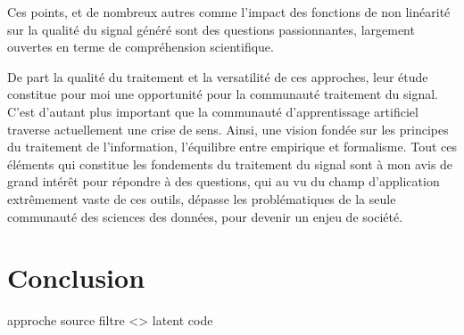 Ces points, et de nombreux autres comme l'impact des fonctions de non linéarité sur la qualité du signal généré sont des questions passionnantes, largement ouvertes en terme de compréhension scientifique.

De part la qualité du traitement et la versatilité de ces approches, leur étude constitue pour moi une opportunité pour la communauté traitement du signal. C'est d'autant plus important que la communauté d'apprentissage artificiel traverse actuellement une crise de sens. Ainsi, une vision fondée sur les principes du traitement de l'information, l'équilibre entre empirique et formalisme. Tout ces éléments qui constitue les fondements du traitement du signal sont à mon avis de grand intérêt pour répondre à des questions, qui au vu du champ d'application extrêmement vaste de ces outils, dépasse les problématiques de la seule communauté des sciences des données, pour devenir un enjeu de société.

\section{Conclusion}

approche source filtre <> latent code

